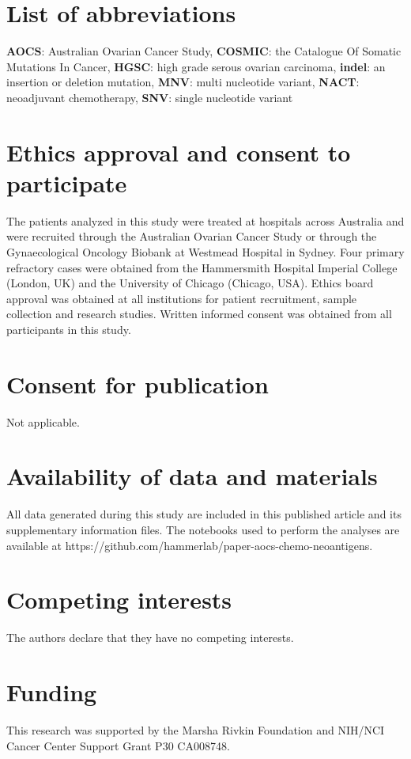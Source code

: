 \documentclass[linenumbers]{bmcart}
\begin{document}
\begin{backmatter}

\section*{List of abbreviations}
\textbf{AOCS}: Australian Ovarian Cancer Study, \textbf{COSMIC}: the Catalogue Of Somatic Mutations In Cancer, \textbf{HGSC}: high grade serous ovarian carcinoma, \textbf{indel}: an insertion or deletion mutation, \textbf{MNV}: multi nucleotide variant, \textbf{NACT}: neoadjuvant chemotherapy, \textbf{SNV}: single nucleotide variant

\section*{Ethics approval and consent to participate}
The patients analyzed in this study were treated at hospitals across Australia and were recruited through the Australian Ovarian Cancer Study or through the Gynaecological Oncology Biobank at Westmead Hospital in Sydney. Four primary refractory cases were obtained from the Hammersmith Hospital Imperial College (London, UK) and the University of Chicago (Chicago, USA). Ethics board approval was obtained at all institutions for patient recruitment, sample collection and research studies. Written informed consent was obtained from all participants in this study.


\section*{Consent for publication}
Not applicable.

\section*{Availability of data and materials}
All data generated during this study are included in this published article and its supplementary information files. The notebooks used to perform the analyses are available at https://github.com/hammerlab/paper-aocs-chemo-neoantigens.

\section*{Competing interests}
  The authors declare that they have no competing interests.
  
\section*{Funding}
This research was supported by the Marsha Rivkin Foundation and NIH/NCI Cancer Center Support Grant P30 CA008748.


\end{backmatter}
\end{document}
